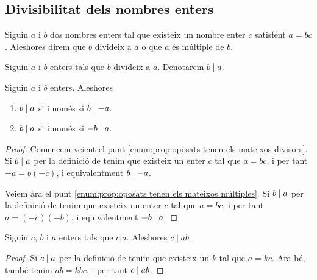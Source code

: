 \documentclass[../../Main.tex]{subfiles}
\begin{document}
	\subsection{Divisibilitat dels nombres enters}
	\begin{definition}
		\label{def:divisor Z}
		\label{def:múltiple Z}
		Siguin \(a\) i \(b\) dos nombres enters tal que existeix un nombre enter \(c\) satisfent \(a=bc\). Aleshores direm que \(b\) divideix a \(a\) o que \(a\) és múltiple de \(b\).
	\end{definition}
	\begin{notation}
		Siguin \(a\) i \(b\) enters tals que \(b\) divideix a \(a\). Denotarem \(b\mathrel{|} a\).
	\end{notation}
	\begin{proposition}
		\label{prop:oposats tenen els mateixos divisors}
		\label{prop:oposats tenen els mateixos múltiples}
		Siguin \(a\) i \(b\) enters. Aleshores
		\begin{enumerate}
			\item\label{enum:prop:oposats tenen els mateixos divisors} \(b\mathrel{|} a\) si i només si \(b\mathrel{|}-a\).
			\item\label{enum:prop:oposats tenen els mateixos múltiples} \(b\mathrel{|} a\) si i només si \(-b\mathrel{|} a\).
		\end{enumerate}
		\begin{proof}
			Comencem veient el punt \eqref{enum:prop:oposats tenen els mateixos divisors}. Si \(b\mathrel{|} a\) per la definició de  tenim que existeix un enter \(c\) tal que \(a=bc\), i per tant \(-a=b(-c)\), i equivalentment \(b\mathrel{|}-a\).
			
			Veiem ara el punt \eqref{enum:prop:oposats tenen els mateixos múltiples}. Si \(b\mathrel{|} a\) per la definició de  tenim que existeix un enter \(c\) tal que \(a=bc\), i per tant \(a=(-c)(-b)\), i equivalentment \(-b\mathrel{|} a\).
		\end{proof}
	\end{proposition}
	\begin{proposition}
		\label{prop:divisors divideixen el divident escalat}
		Siguin \(c\), \(b\) i \(a\) enters tals que \(c|a\). Aleshores \(c\mathrel{|} ab\).
		\begin{proof}
			Si \(c\mathrel{|} a\) per la definició de  tenim que existeix un \(k\) tal que \(a=kc\). Ara bé, també tenim \(ab=kbc\), i per tant \(c\mathrel{|} ab\).
		\end{proof}
	\end{proposition}
\end{document}
